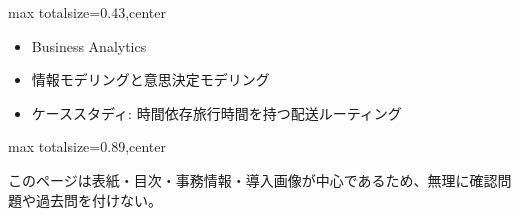 \clearpage
{}
\begin{minipage}[t]{0.405\textwidth}
\begin{adjustbox}{max totalsize={\textwidth}{0.43\textheight},center}
\begin{minipage}{\textwidth}\scriptsize
{}\begin{itemize}
\item Business Analytics
\item 情報モデリングと意思決定モデリング
\item ケーススタディ: 時間依存旅行時間を持つ配送ルーティング
\end{itemize}
\end{minipage}
\end{adjustbox}
\end{minipage}\hfill
\begin{minipage}[t]{0.58\textwidth}
\begin{adjustbox}{max totalsize={\textwidth}{0.89\textheight},center}
\begin{minipage}{\textwidth}\scriptsize
{}このページは表紙・目次・事務情報・導入画像が中心であるため、無理に確認問題や過去問を付けない。
\end{minipage}
\end{adjustbox}
\end{minipage}

